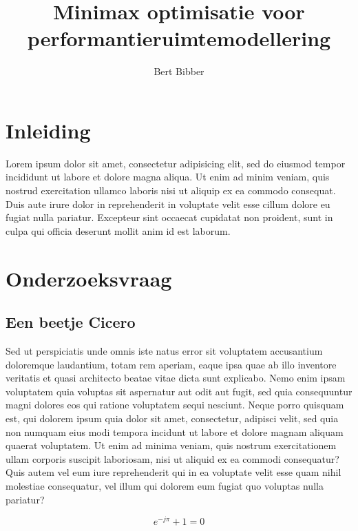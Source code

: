\documentclass[a4paper,11pt,twoside,openright,english]{uamasterthesis}
\title{Minimax optimisatie voor performantieruimtemodellering}
\author{Bert Bibber}
\begin{document}

\maketitle

\frontmatter

\tableofcontents

\mainmatter
\chapter*{Inleiding}
Lorem ipsum dolor sit amet, consectetur adipisicing elit, sed do
eiusmod tempor incididunt ut labore et dolore magna aliqua. Ut enim ad
minim veniam, quis nostrud exercitation ullamco laboris nisi ut
aliquip ex ea commodo consequat. Duis aute irure dolor in
reprehenderit in voluptate velit esse cillum dolore eu fugiat nulla
pariatur. Excepteur sint occaecat cupidatat non proident, sunt in
culpa qui officia deserunt mollit anim id est laborum.

\chapter{Onderzoeksvraag}

\section{Een beetje Cicero}
Sed ut perspiciatis unde omnis iste natus error sit voluptatem
accusantium doloremque laudantium, totam rem aperiam, eaque ipsa quae
ab illo inventore veritatis et quasi architecto beatae vitae dicta
sunt explicabo. Nemo enim ipsam voluptatem quia voluptas sit
aspernatur aut odit aut fugit, sed quia consequuntur magni dolores eos
qui ratione voluptatem sequi nesciunt. Neque porro quisquam est, qui
dolorem ipsum quia dolor sit amet, consectetur, adipisci velit, sed
quia non numquam eius modi tempora incidunt ut labore et dolore magnam
aliquam quaerat voluptatem. Ut enim ad minima veniam, quis nostrum
exercitationem ullam corporis suscipit laboriosam, nisi ut aliquid ex
ea commodi consequatur? Quis autem vel eum iure reprehenderit qui in
ea voluptate velit esse quam nihil molestiae consequatur, vel illum
qui dolorem eum fugiat quo voluptas nulla pariatur?

\begin{equation}
  e^{-j\pi} + 1 = 0
\end{equation}
\end{document}
